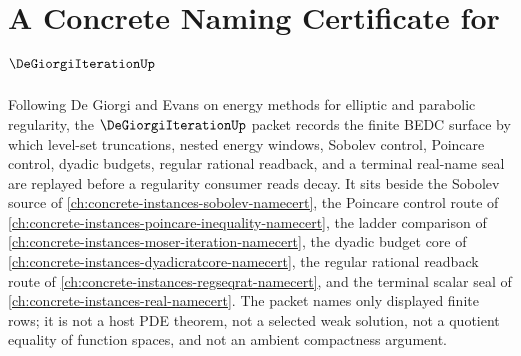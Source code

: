 \chapter{A Concrete Naming Certificate for $\DeGiorgiIterationUp$}
\label{ch:concrete-instances-de-giorgi-iteration-namecert}

Following De Giorgi and Evans on energy methods for elliptic and parabolic regularity, the $\DeGiorgiIterationUp$ packet records the finite BEDC surface by which level-set truncations, nested energy windows, Sobolev control, Poincare control, dyadic budgets, regular rational readback, and a terminal real-name seal are replayed before a regularity consumer reads decay. It sits beside the Sobolev source of \autoref{ch:concrete-instances-sobolev-namecert}, the Poincare control route of \autoref{ch:concrete-instances-poincare-inequality-namecert}, the ladder comparison of \autoref{ch:concrete-instances-moser-iteration-namecert}, the dyadic budget core of \autoref{ch:concrete-instances-dyadicratcore-namecert}, the regular rational readback route of \autoref{ch:concrete-instances-regseqrat-namecert}, and the terminal scalar seal of \autoref{ch:concrete-instances-real-namecert}. The packet names only displayed finite rows; it is not a host PDE theorem, not a selected weak solution, not a quotient equality of function spaces, and not an ambient compactness argument.

